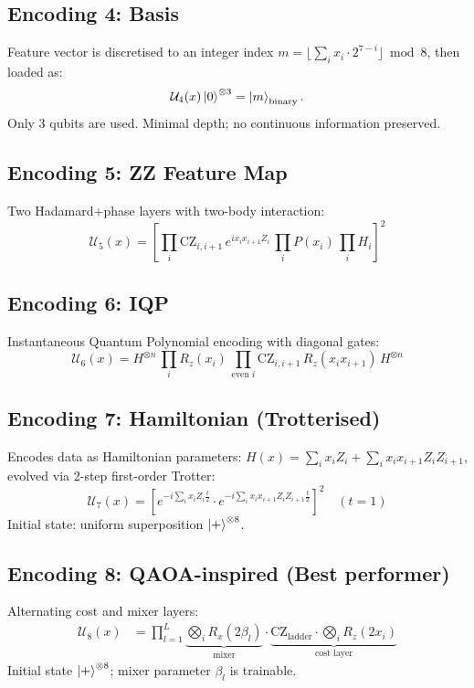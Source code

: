 \documentclass[12pt,a4paper]{article}
\begin{document}
\subsection{Encoding 4: Basis}
Feature vector is discretised to an integer index
$m = \lfloor\sum_i x_i \cdot 2^{7-i}\rfloor \bmod 8$, then loaded as:
\begin{equation}
  \mathcal{U}_4(x)\ket{0}^{\otimes 3} = \ket{m}_\text{binary}.
\end{equation}
Only 3 qubits are used. Minimal depth; no continuous information preserved.

\subsection{Encoding 5: ZZ Feature Map}
Two Hadamard+phase layers with two-body interaction:
\begin{equation}
  \mathcal{U}_5(x) = \left[\prod_{i}\text{CZ}_{i,i+1}\,
  e^{i x_i x_{i+1} Z_i}\,\prod_i P(x_i)\,\prod_i H_i\right]^2
\end{equation}

\subsection{Encoding 6: IQP}
Instantaneous Quantum Polynomial encoding with diagonal gates:
\begin{equation}
  \mathcal{U}_6(x) = H^{\otimes n}\,
  \prod_i R_z(x_i)\,\prod_{\text{even }i}\text{CZ}_{i,i+1}\,
  R_z(x_i x_{i+1})\,H^{\otimes n}
\end{equation}

\subsection{Encoding 7: Hamiltonian (Trotterised)}
Encodes data as Hamiltonian parameters:
$H(x) = \sum_i x_i Z_i + \sum_i x_i x_{i+1} Z_i Z_{i+1}$,
evolved via 2-step first-order Trotter:
\begin{equation}
  \mathcal{U}_7(x) = \left[e^{-i\sum_i x_i Z_i \frac{t}{2}}
  \cdot e^{-i\sum_i x_i x_{i+1} Z_i Z_{i+1}\frac{t}{2}}\right]^2
  \quad (t=1)
\end{equation}
Initial state: uniform superposition $\ket{+}^{\otimes 8}$.

\subsection{Encoding 8: QAOA-inspired (Best performer)}
Alternating cost and mixer layers:
\begin{align}
  \mathcal{U}_8(x) &= \prod_{l=1}^{L}
  \underbrace{\bigotimes_i R_x(2\beta_l)}_{\text{mixer}}
  \cdot
  \underbrace{\text{CZ}_\text{ladder}\cdot\bigotimes_i R_z(2x_i)}_{\text{cost layer}}
\end{align}
Initial state $\ket{+}^{\otimes 8}$; mixer parameter $\beta_l$ is trainable.
\end{document}
